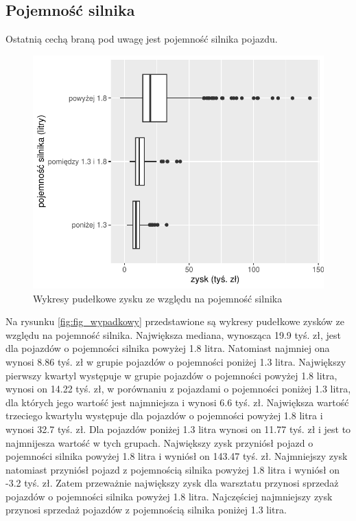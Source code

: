 \documentclass{article}\usepackage[]{graphicx}\usepackage[]{xcolor}
\makeatletter
\def\maxwidth{ %
  \ifdim\Gin@nat@width>\linewidth
    \linewidth
  \else
    \Gin@nat@width
  \fi
}
\newenvironment{knitrout}{}{} %
\makeatother
\begin{document}
\subsection{Pojemność silnika}

Ostatnią cechą braną pod uwagę jest pojemność silnika pojazdu.

\begin{knitrout}
\color{fgcolor}\begin{figure}[H]

{\centering \includegraphics[width=\maxwidth]{figure/fig_pojemnosc-1} 

}

\caption[Wykresy pudełkowe zysku ze względu na pojemność silnika]{Wykresy pudełkowe zysku ze względu na pojemność silnika}\label{fig:fig_pojemnosc}
\end{figure}

\end{knitrout}

Na rysunku \ref{fig:fig_wypadkowy} przedstawione są wykresy pudełkowe zysków ze względu na pojemność silnika. Największa mediana, wynosząca 19.9 tyś. zł, jest dla pojazdów o pojemności silnika powyżej 1.8 litra. Natomiast najmniej ona wynosi 8.86 tyś. zł w grupie pojazdów o pojemności poniżej 1.3 litra. 
Największy pierwszy kwartyl występuje w grupie pojazdów o pojemności powyżej 1.8 litra, wynosi on 14.22 tyś. zł, w porównaniu z pojazdami o pojemności poniżej 1.3 litra, dla których jego wartość jest najmniejsza i wynosi 6.6 tyś. zł.
Największa wartość trzeciego kwartylu występuje dla pojazdów o pojemności powyżej 1.8 litra i wynosi 32.7 tyś. zł. Dla pojazdów poniżej 1.3 litra wynosi on 11.77 tyś. zł i jest to najmnijesza wartość w tych grupach.
Największy zysk przyniósł pojazd o pojemności silnika powyżej 1.8 litra i wyniósł on 143.47 tyś. zł. 
Najmniejszy zysk natomiast przyniósł pojazd z pojemnością silnika powyżej 1.8 litra i wyniósł on -3.2 tyś. zł. Zatem przeważnie największy zysk dla warsztatu przynosi sprzedaż pojazdów o pojemności silnika powyżej 1.8 litra. Najczęściej najmniejszy zysk przynosi sprzedaż pojazdów z pojemnością silnika poniżej 1.3 litra.
\end{document}

